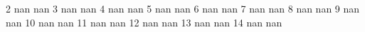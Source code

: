 2 nan nan
3 nan nan
4 nan nan
5 nan nan
6 nan nan
7 nan nan
8 nan nan
9 nan nan
10 nan nan
11 nan nan
12 nan nan
13 nan nan
14 nan nan
